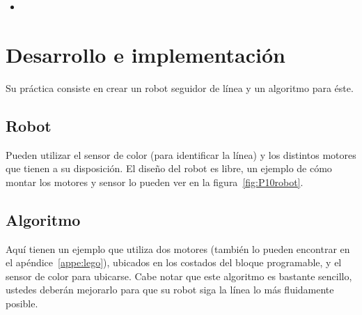 \begin{itemize}
 \item {}
\end{itemize}

\section{Desarrollo e implementación}

Su práctica consiste en crear un robot seguidor de línea y un algoritmo para éste.

\subsection{Robot}

Pueden utilizar el sensor de color (para identificar la línea) y los distintos motores que tienen a su disposición. El diseño del robot es libre, un ejemplo de cómo montar los motores y sensor lo pueden ver en la figura~\ref{fig:P10robot}.

\subsection{Algoritmo}

Aquí tienen un ejemplo que utiliza dos motores (también lo pueden encontrar en el apéndice~\ref{appe:lego}), ubicados en los costados del bloque programable, y el sensor de color para ubicarse. Cabe notar que este algoritmo es bastante sencillo, ustedes deberán mejorarlo para que su robot siga la línea lo más fluidamente posible.

